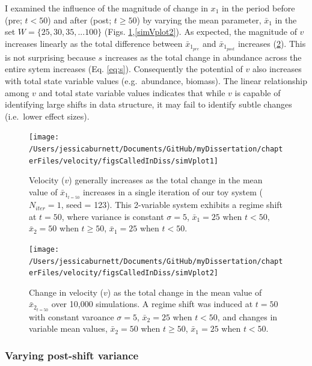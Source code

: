 \documentclass[12pt,twoside,openany]{reedthesis}
\begin{document}
I examined the influence of the magnitude of change in \(x_1\) in the period before (pre; \(t <50\)) and after (post; \(t \geq 50\)) by varying the mean parameter, \(\bar{x}_1\) in the set \(W=\{25,30,35,...100 \}\) (Figs. \ref{fig:simVplot1},\ref{simVplot2}). As expected, the magnitude of \(v\) increases linearly as the total difference between \(\bar{x}_{1_{pre}}\) and \(\bar{x}_{1_{post}}\) increases (\ref{fig:simVplot2}). This is not surprising because \(s\) increases as the total change in abundance across the entire sytem increases (Eq. \eqref{eq:s}). Consequently the potential of \(v\) also increases with total state variable values (e.g.~abundance, biomass). The linear relationship among \(v\) and total state variable values indicates that while \(v\) is capable of identifying large shifts in data structure, it may fail to identify subtle changes (i.e.~lower effect sizes).
\begin{figure}
\texttt{[image: /Users/jessicaburnett/Documents/GitHub/myDissertation/chapterFiles/velocity/figsCalledInDiss/simVplot1]} \caption{Velocity ($v$) generally increases as the total change in the mean value of $\bar{x}_{1_{t=50}}$ increases in a single iteration of our toy system ($N_{iter}=1$, seed = 123). This 2-variable system exhibits a regime shift at $t=50$, where variance is constant $\sigma = 5$, $\bar{x}_1 = 25$ when $t<50$,  $\bar{x}_2=50$ when $t\geq50$, $\bar{x}_1 = 25$ when $t <50$.}\label{fig:simVplot1}
\end{figure}
\begin{figure}
\texttt{[image: /Users/jessicaburnett/Documents/GitHub/myDissertation/chapterFiles/velocity/figsCalledInDiss/simVplot2]} \caption{Change in velocity ($v$) as the total change in the mean value of $\bar{x}_{2_{t=50}}$ over 10,000 simulations. A regime shift was induced at $t=50$ with constant varoance $\sigma = 5$, $\bar{x}_2 = 25$ when $t<50$,  and changes in variable mean values, $\bar{x}_2 = 50$ when $t \geq 50$, $\bar{x}_1 = 25$ when $t<50$.}\label{fig:simVplot2}
\end{figure}
\hypertarget{varying-post-shift-variance}{%
\subsubsection{Varying post-shift variance}\label{varying-post-shift-variance}}
\end{document}

